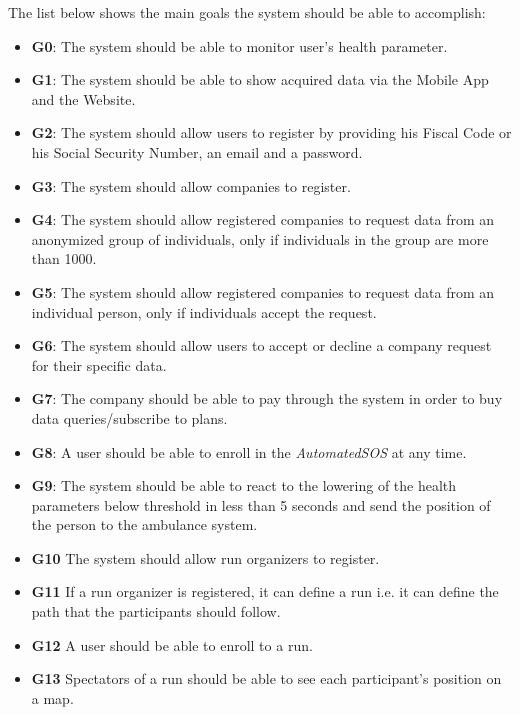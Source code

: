 The list below shows the main goals the system should be able to accomplish:

\begin{itemize}
    \item \textbf{G0}: The system should be able to monitor user's health parameter.
    \item \textbf{G1}: The system should be able to show acquired data via the Mobile App and the Website.
    \item \textbf{G2}: The system should allow users to register by providing his Fiscal Code or his Social Security Number, an email and a password.
    \item \textbf{G3}: The system should allow companies to register.
    \item \textbf{G4}: The system should allow registered companies to request data from an anonymized group of individuals, only if individuals in the group are more than 1000.
    \item \textbf{G5}: The system should allow registered companies to request data from an individual person, only if individuals accept the request.
    \item \textbf{G6}: The system should allow users to accept or decline a company request for their specific data.
    \item \textbf{G7}: The company should be able to pay through the system in order to buy data queries/subscribe to plans.

    \item \textbf{G8}: A user should be able to enroll in the \textit{AutomatedSOS} at any time.
    \item \textbf{G9}: The system should be able to react to the lowering of the health parameters below threshold in less than 5 seconds and send the position of the person to the ambulance system. 
    
    \item \textbf{G10} The system should allow run organizers to register.
    \item \textbf{G11} If a run organizer is registered, it can define a run i.e. it can define the path that the participants should follow.
    \item \textbf{G12} A user should be able to enroll to a run.
    \item \textbf{G13} Spectators of a run should be able to see each participant's position on a map.
\end{itemize}





